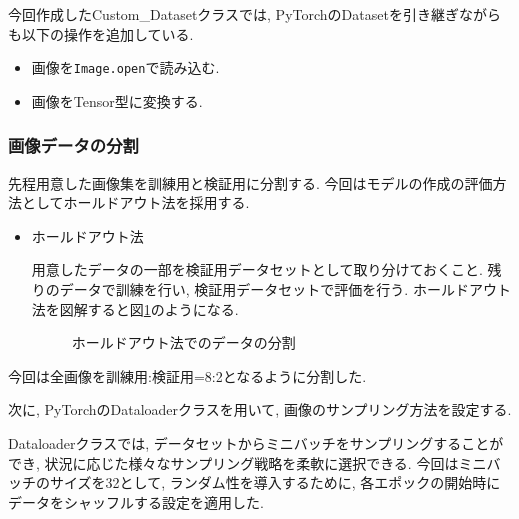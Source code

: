\documentclass[dvipdfmx]{jsarticle}
\begin{document}
今回作成したCustom\_Datasetクラスでは, PyTorchのDatasetを引き継ぎながらも以下の操作を追加している.
\begin{itemize}
    \item 画像を\verb|Image.open|で読み込む.
    \item 画像をTensor型に変換する.
\end{itemize}

\subsubsection{画像データの分割}
先程用意した画像集を訓練用と検証用に分割する.
今回はモデルの作成の評価方法としてホールドアウト法を採用する.
\begin{itemize}
    \item ホールドアウト法
    
    用意したデータの一部を検証用データセットとして取り分けておくこと.
    残りのデータで訓練を行い, 検証用データセットで評価を行う.
    ホールドアウト法を図解すると図\ref{dataset}のようになる.
    
   
   \begin{figure}[H]
        \centering
        \caption{ホールドアウト法でのデータの分割}
        \label{dataset}
    \end{figure}
    
    

    
\end{itemize}

今回は全画像を訓練用:検証用=8:2となるように分割した.

次に, PyTorchのDataloaderクラスを用いて, 画像のサンプリング方法を設定する.

Dataloaderクラスでは, データセットからミニバッチをサンプリングすることができ, 状況に応じた様々なサンプリング戦略を柔軟に選択できる.
今回はミニバッチのサイズを32として, ランダム性を導入するために, 各エポックの開始時にデータをシャッフルする設定を適用した.
\end{document}
